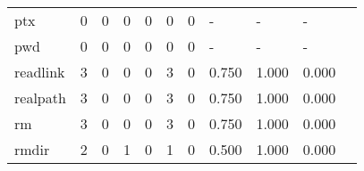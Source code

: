 \begin{longtable}{lp{1.20cm}p{1.20cm}p{1.20cm}p{1.20cm}p{1.20cm}p{1.20cm}p{1.20cm}p{1.20cm}p{1.20cm}p{1.20cm}}
ptx       &                                     0 &                                                  0 &                                                  0 &                                                  0 &                                                  0 &                                                  0 &                                             - &                                                  - &                                                  - \\
pwd       &                                     0 &                                                  0 &                                                  0 &                                                  0 &                                                  0 &                                                  0 &                                             - &                                                  - &                                                  - \\
readlink  &                                     3 &                                                  0 &                                                  0 &                                                  0 &                                                  3 &                                                  0 &                                         0.750 &                                              1.000 &                                              0.000 \\
realpath  &                                     3 &                                                  0 &                                                  0 &                                                  0 &                                                  3 &                                                  0 &                                         0.750 &                                              1.000 &                                              0.000 \\
rm        &                                     3 &                                                  0 &                                                  0 &                                                  0 &                                                  3 &                                                  0 &                                         0.750 &                                              1.000 &                                              0.000 \\
rmdir     &                                     2 &                                                  0 &                                                  1 &                                                  0 &                                                  1 &                                                  0 &                                         0.500 &                                              1.000 &                                              0.000 \\

\end{longtable}
